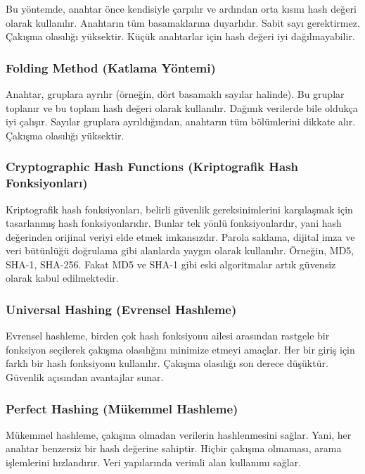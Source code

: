 Bu yöntemde, anahtar önce kendisiyle çarpılır ve ardından orta kısmı hash değeri olarak kullanılır. Anahtarın tüm basamaklarına duyarlıdır. Sabit sayı gerektirmez. Çakışma olasılığı yüksektir. Küçük anahtarlar için hash değeri iyi dağılmayabilir.

\subsubsection{Folding Method (Katlama Yöntemi)}

Anahtar, gruplara ayrılır (örneğin, dört basamaklı sayılar halinde). Bu gruplar toplanır ve bu toplam hash değeri olarak kullanılır. Dağınık verilerde bile oldukça iyi çalışır. Sayılar gruplara ayrıldığından, anahtarın tüm bölümlerini dikkate alır. Çakışma olasılığı yüksektir.

\subsubsection{Cryptographic Hash Functions (Kriptografik Hash Fonksiyonları)}

Kriptografik hash fonksiyonları, belirli güvenlik gereksinimlerini karşılaşmak için tasarlanmış hash fonksiyonlarıdır. Bunlar tek yönlü fonksiyonlardır, yani hash değerinden orijinal veriyi elde etmek imkansızdır. Parola saklama, dijital imza ve veri bütünlüğü doğrulama gibi alanlarda yaygın olarak kullanılır. Örneğin, MD5, SHA-1, SHA-256. Fakat MD5 ve SHA-1 gibi eski algoritmalar artık güvensiz olarak kabul edilmektedir.

\subsubsection{Universal Hashing (Evrensel Hashleme)}

Evrensel hashleme, birden çok hash fonksiyonu ailesi arasından rastgele bir fonksiyon seçilerek çakışma olasılığını minimize etmeyi amaçlar. Her bir giriş için farklı bir hash fonksiyonu kullanılır. Çakışma olasılığı son derece düşüktür. Güvenlik açısından avantajlar sunar. 

\subsubsection{Perfect Hashing (Mükemmel Hashleme)}

Mükemmel hashleme, çakışma olmadan verilerin hashlenmesini sağlar. Yani, her anahtar benzersiz bir hash değerine sahiptir. Hiçbir çakışma olmaması, arama işlemlerini hızlandırır. Veri yapılarında verimli alan kullanımı sağlar. 

